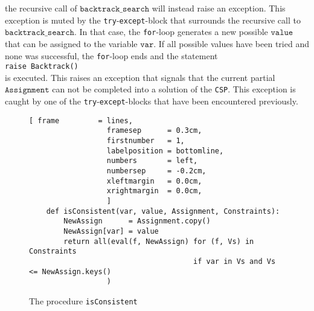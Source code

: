 \begin{enumerate}
      the recursive call of $\texttt{backtrack\_search}$ will instead raise an exception.  This exception is muted 
      by the \texttt{try}-\texttt{except}-block that surrounds the recursive call to $\texttt{backtrack\_search}$.  In that case, the
      \texttt{for}-loop generates a new possible $\texttt{value}$ that can be assigned to the variable
      $\texttt{var}$.  If all possible values have been tried and none was successful, the \texttt{for}-loop
      ends and the statement
      \\[0.2cm]
      \hspace*{1.3cm}
      \texttt{raise Backtrack()}
      \\[0.2cm]
      is executed.  This raises an exception that signals that the current partial $\texttt{Assignment}$ can
      not be completed into a solution of the \texttt{CSP}.
      This exception is caught by one of the \texttt{try}-\texttt{except}-blocks that have been encountered previously.
\end{enumerate}


\begin{figure}[!ht]
\centering
\begin{Verbatim}[ frame         = lines, 
                  framesep      = 0.3cm, 
                  firstnumber   = 1,
                  labelposition = bottomline,
                  numbers       = left,
                  numbersep     = -0.2cm,
                  xleftmargin   = 0.0cm,
                  xrightmargin  = 0.0cm,
                  ]
    def isConsistent(var, value, Assignment, Constraints):
        NewAssign      = Assignment.copy()
        NewAssign[var] = value
        return all(eval(f, NewAssign) for (f, Vs) in Constraints
                                      if var in Vs and Vs <= NewAssign.keys()
                  )
\end{Verbatim}
\vspace*{-0.3cm}
\caption{The procedure \texttt{isConsistent}}
\label{fig:CSP-Solver.ipynb-isConsistent}
\end{figure}

